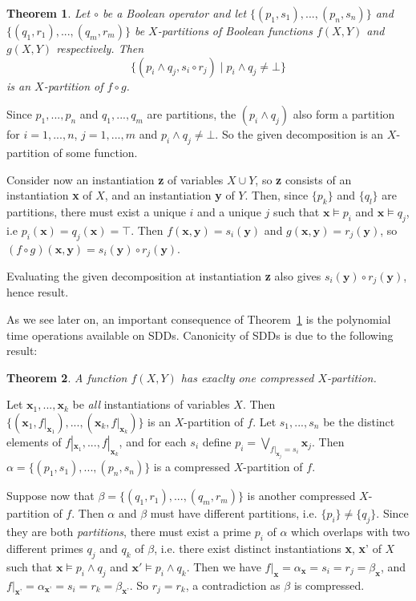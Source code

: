 \documentclass[11pt]{article}
\newtheorem{theorem}{Theorem}[section]
\newenvironment{proof}[1][Proof]{\begin{trivlist}
\item[\hskip \labelsep {\bfseries #1}]}{\end{trivlist}}
\begin{document}
\begin{theorem}
\label{theorem_apply}
Let $\circ$ be a Boolean operator and let $\{(p_1, s_1),...,(p_n, s_n)\}$ and $\{(q_1, r_1),...,(q_m, r_m)\}$  be $X$-partitions of Boolean functions $f(X, Y)$ and $g(X, Y)$ respectively. Then $$\{(p_i \land q_j, s_i \circ r_j) \mid  p_i \land q_j  \neq \bot \}$$ is an $X$-partition of $f \circ g$.
\end{theorem}
\begin{proof}
 Since $p_1, ..., p_n$ and $q_1, ..., q_m$ are partitions, the $(p_i \land q_j)$ also form a partition for $i = 1, ..., n$, $j = 1, ..., m$ and $p_i \land q_j \neq \bot$. So the given decomposition is an $X$-partition of some function.

Consider now an instantiation \textbf{z} of variables $X\cup Y$, so \textbf{z} consists of an instantiation \textbf{x} of $X$, and an instantiation \textbf{y} of $Y$. 
Then, since $\{p_k\}$ and $\{q_l\}$ are partitions, there must exist a unique $i$ and a unique $j$ such that $\textbf{x} \models p_i$ and $\textbf{x} \models q_j$, i.e $p_i(\textbf{x}) = q_j(\textbf{x}) = \top$. Then $f(\textbf{x}, \textbf{y}) = s_i(\textbf{y})$ and $g(\textbf{x}, \textbf{y}) = r_j(\textbf{y})$, so $(f\circ g)(\textbf{x}, \textbf{y}) = s_i(\textbf{y})\circ r_j(\textbf{y}).$

Evaluating the given decomposition at instantiation \textbf{z} also gives $s_i(\textbf{y}) \circ r_j(\textbf{y})$, hence result. 
\end{proof}

As we see later on, an important consequence of Theorem~\ref{theorem_apply} is the polynomial time operations available on SDDs. Canonicity of SDDs is due to the following result:

\begin{theorem}
\label{unique_compressed}
A function $f(X, Y)$ has exaclty one compressed $X$-partition.
\end{theorem}
\begin{proof}
Let $\textbf{x}_1, ..., \textbf{x}_k$ be \textit{all} instantiations of variables $X$. Then $\{(\textbf{x}_1, f|_{\textbf{x}_1}), ..., (\textbf{x}_k, f|_{\textbf{x}_k})\}$ is an $X$-partition of $f$. Let $s_1, ..., s_n$ be the distinct elements of $f|_{\textbf{x}_1}, ..., f|_{\textbf{x}_k}$, and for each $s_i$ define $p_i = \bigvee_{f|_{\textbf{x}_j} = s_i} \textbf{x}_j$.
Then $\alpha = \{(p_1, s_1), ..., (p_n, s_n)\}$ is a compressed $X$-partition of $f$. 

Suppose now that $\beta = \{(q_1, r_1), ..., (q_m, r_m)\}$ is another compressed $X$-partition of $f$. Then $\alpha$ and $\beta$ must have different partitions, i.e. $\{p_i\} \neq \{q_j\}$. Since they are both \textit{partitions}, there must exist a prime $p_i$ of $\alpha$ which overlaps with two different primes $q_j$ and $q_k$ of $\beta$, i.e. there exist distinct instantiations \textbf{x}, \textbf{x}' of $X$ such that $\textbf{x} \models p_i \land q_j$ and $\textbf{x}' \models p_i \land q_k$. Then we have $f|_\textbf{x} = \alpha_\textbf{x} = s_i = r_j = \beta_\textbf{x}$, and $f|_\textbf{x'} = \alpha_\textbf{x'} = s_i = r_k = \beta_\textbf{x'}$. So $r_j = r_k$, a contradiction as $\beta$ is compressed.  
\end{proof}
\end{document}
